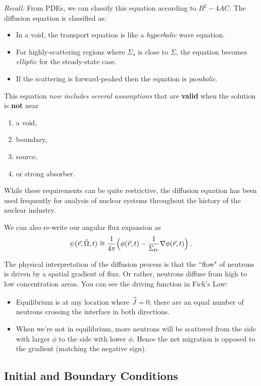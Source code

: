 \documentclass[12pt]{article}
\newcommand{\Macro}{\ensuremath{\Sigma}}
\newcommand{\vOmega}{\ensuremath{\hat{\Omega}}}
\begin{document}
\textit{Recall:} From PDEs, we can classify this equation according to $B^2-4AC$.  The diffusion equation is classified as:

\begin{itemize}
\item In a void, the transport equation is like a \textit{hyperbolic} wave equation. 
\item For highly-scattering regions where $\Macro_{s}$ is close to $\Macro$, the equation becomes \textit{elliptic} for the steady-state case. 
\item If the scattering is forward-peaked then the equation is \textit{parabolic}.
\end{itemize}

This equation \textit{now includes several assumptions} that are \textbf{valid} when the solution is \textbf{not} near
%
\begin{enumerate}
\item  a void, 
\item boundary, 
\item source, 
\item or strong absorber.
\end{enumerate} 
%
While these requirements can be quite restrictive, the diffusion equation has been used frequently for analysis of nuclear systems throughout the history of the nuclear industry.

We can also re-write our angular flux expansion as
\[\psi(\vec{r}, \vOmega, t) \cong \frac{1}{4\pi}\Bigl(\phi(\vec{r}, t)  -\frac{1}{\Sigma_{tr}} \nabla \phi(\vec{r}, t)\Bigr) \:.\]

The physical interpretation of the diffusion process is that the ``flow" of neutrons is driven by a spatial gradient of flux. Or rather, neutrons diffuse from high to low concentration areas. You can see the driving function in Fick's Law: 
%
\begin{itemize}
\item Equilibrium is at any location where $\vec{J} = 0$; there are an equal number of neutrons crossing the interface in both directions.
\item When we're not in equilibrium, more neutrons will be scattered from the side with larger $\phi$ to the side with lower $\phi$. Hence the net migration is opposed to the gradient (matching the negative sign). 
\end{itemize}
 

\subsection*{Initial and Boundary Conditions}
\end{document}
